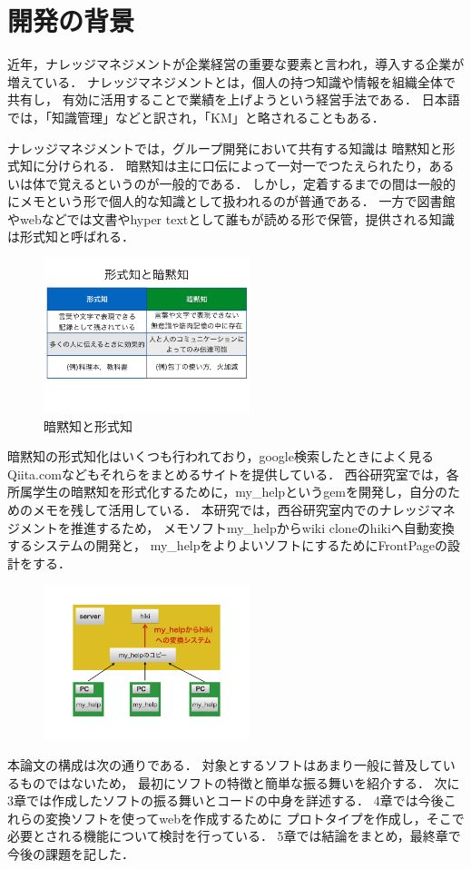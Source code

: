 \section{開発の背景}
近年，ナレッジマネジメントが企業経営の重要な要素と言われ，導入する企業が増えている．
ナレッジマネジメントとは，個人の持つ知識や情報を組織全体で共有し，
有効に活用することで業績を上げようという経営手法である．
日本語では，「知識管理」などと訳され，「KM」と略されることもある\cite{a}．

ナレッジマネジメントでは，グループ開発において共有する知識は
暗黙知と形式知に分けられる\cite{b}．
暗黙知は主に口伝によって一対一でつたえられたり，あるいは体で覚えるというのが一般的である．
しかし，定着するまでの間は一般的にメモという形で個人的な知識として扱われるのが普通である．
一方で図書館やwebなどでは文書やhyper textとして誰もが読める形で保管，提供される知識は形式知と呼ばれる．

\begin{figure}[htbp]
\begin{center}
\includegraphics[width=6cm,bb=100 100 600 700]{my_help2hiki_saki.001.png}
\caption{暗黙知と形式知}
\label{default}\end{center}\end{figure}


暗黙知の形式知化はいくつも行われており，google検索したときによく見るQiita.comなどもそれらをまとめるサイトを提供している．
西谷研究室では，各所属学生の暗黙知を形式化するために，my\_helpというgemを開発し，自分のためのメモを残して活用している．
本研究では，西谷研究室内でのナレッジマネジメントを推進するため，
メモソフトmy\_helpからwiki cloneのhikiへ自動変換するシステムの開発と，
my\_helpをよりよいソフトにするためにFrontPageの設計をする．

\begin{figure}[htbp]
\begin{center}
\includegraphics[width=6cm,bb=100 100 600 700]{my_help2hiki_saki.011.png}
\caption{}
\label{default}\end{center}\end{figure}

本論文の構成は次の通りである．
対象とするソフトはあまり一般に普及しているものではないため，
最初にソフトの特徴と簡単な振る舞いを紹介する．
次に3章では作成したソフトの振る舞いとコードの中身を詳述する．
4章では今後これらの変換ソフトを使ってwebを作成するために
プロトタイプを作成し，そこで必要とされる機能について検討を行っている．
5章では結論をまとめ，最終章で今後の課題を記した．

